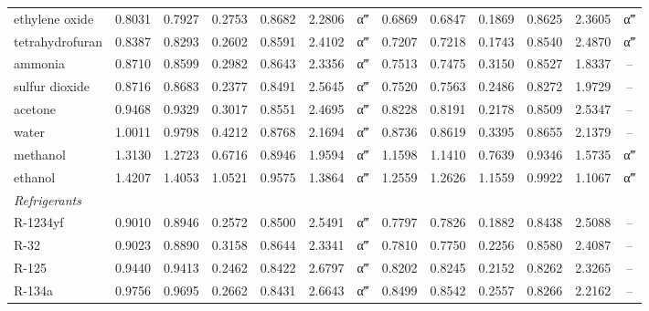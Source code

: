 \begin{table}[H]
\begin{tabular}{lcccccccccccc}
ethylene oxide & 0.8031 & 0.7927 & 0.2753 & 0.8682 & 2.2806 & α‴ & 0.6869 & 0.6847 & 0.1869 & 0.8625 & 2.3605 & α‴ \\
tetrahydrofuran & 0.8387 & 0.8293 & 0.2602 & 0.8591 & 2.4102 & α‴ & 0.7207 & 0.7218 & 0.1743 & 0.8540 & 2.4870 & α‴ \\
ammonia & 0.8710 & 0.8599 & 0.2982 & 0.8643 & 2.3356 & α‴ & 0.7513 & 0.7475 & 0.3150 & 0.8527 & 1.8337 & -- \\
sulfur dioxide & 0.8716 & 0.8683 & 0.2377 & 0.8491 & 2.5645 & α‴ & 0.7520 & 0.7563 & 0.2486 & 0.8272 & 1.9729 & -- \\
acetone & 0.9468 & 0.9329 & 0.3017 & 0.8551 & 2.4695 & α‴ & 0.8228 & 0.8191 & 0.2178 & 0.8509 & 2.5347 & -- \\
water & 1.0011 & 0.9798 & 0.4212 & 0.8768 & 2.1694 & α‴ & 0.8736 & 0.8619 & 0.3395 & 0.8655 & 2.1379 & -- \\
methanol & 1.3130 & 1.2723 & 0.6716 & 0.8946 & 1.9594 & α‴ & 1.1598 & 1.1410 & 0.7639 & 0.9346 & 1.5735 & α‴ \\
ethanol & 1.4207 & 1.4053 & 1.0521 & 0.9575 & 1.3864 & α‴ & 1.2559 & 1.2626 & 1.1559 & 0.9922 & 1.1067 & α‴ \\
\multicolumn{13}{l}{\emph{Refrigerants}} \\
R-1234yf & 0.9010 & 0.8946 & 0.2572 & 0.8500 & 2.5491 & α‴ & 0.7797 & 0.7826 & 0.1882 & 0.8438 & 2.5088 & -- \\
R-32 & 0.9023 & 0.8890 & 0.3158 & 0.8644 & 2.3341 & α‴ & 0.7810 & 0.7750 & 0.2256 & 0.8580 & 2.4087 & -- \\
R-125 & 0.9440 & 0.9413 & 0.2462 & 0.8422 & 2.6797 & α‴ & 0.8202 & 0.8245 & 0.2152 & 0.8262 & 2.3265 & -- \\
R-134a & 0.9756 & 0.9695 & 0.2662 & 0.8431 & 2.6643 & α‴ & 0.8499 & 0.8542 & 0.2557 & 0.8266 & 2.2162 & -- \\
\bottomrule
\end{tabular}
\end{table}
